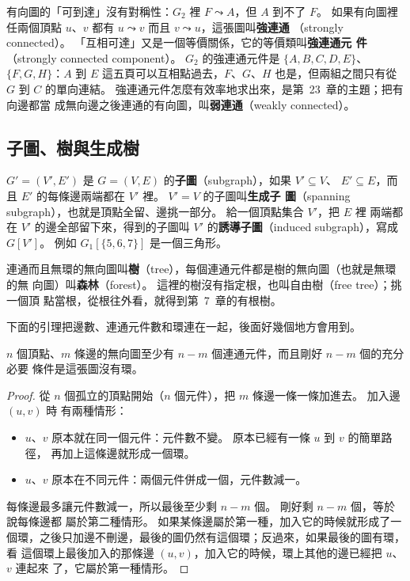 有向圖的「可到達」沒有對稱性：$G_2$ 裡 $F \leadsto A$，但 $A$ 到不了 $F$。 如果有向圖裡
任兩個頂點 $u$、$v$ 都有 $u \leadsto v$ 而且 $v \leadsto u$，這張圖叫\textbf{強連通}
（strongly connected）。 「互相可達」又是一個等價關係，它的等價類叫\textbf{強連通元
件}（strongly connected component）。 $G_2$ 的強連通元件是 $\{A, B, C, D, E\}$、
$\{F, G, H\}$：$A$ 到 $E$ 這五頁可以互相點過去，$F$、$G$、$H$ 也是，但兩組之間只有從
$G$ 到 $C$ 的單向連結。 強連通元件怎麼有效率地求出來，是第~23~章的主題；把有向邊都當
成無向邊之後連通的有向圖，叫\textbf{弱連通}（weakly connected）。

\subsection{子圖、樹與生成樹}

$G' = (V', E')$ 是 $G = (V, E)$ 的\textbf{子圖}（subgraph），如果 $V' \subseteq V$、
$E' \subseteq E$，而且 $E'$ 的每條邊兩端都在 $V'$ 裡。 $V' = V$ 的子圖叫\textbf{生成子
圖}（spanning subgraph），也就是頂點全留、邊挑一部分。 給一個頂點集合 $V'$，把 $E$ 裡
兩端都在 $V'$ 的邊全部留下來，得到的子圖叫 $V'$ 的\textbf{誘導子圖}（induced
subgraph），寫成 $G[V']$。 例如 $G_1[\{5, 6, 7\}]$ 是一個三角形。

連通而且無環的無向圖叫\textbf{樹}（tree），每個連通元件都是樹的無向圖（也就是無環的無
向圖）叫\textbf{森林}（forest）。 這裡的樹沒有指定根，也叫自由樹（free tree）；挑一個頂
點當根，從根往外看，就得到第~7~章的有根樹。

下面的引理把邊數、連通元件數和環連在一起，後面好幾個地方會用到。

\begin{lemma}
\label{lem:gtr-count}
$n$ 個頂點、$m$ 條邊的無向圖至少有 $n - m$ 個連通元件，而且剛好 $n - m$ 個的充分必要
條件是這張圖沒有環。
\end{lemma}

\begin{proof}
從 $n$ 個孤立的頂點開始（$n$ 個元件），把 $m$ 條邊一條一條加進去。 加入邊 $(u, v)$ 時
有兩種情形：
\begin{itemize}
\item $u$、$v$ 原本就在同一個元件：元件數不變。 原本已經有一條 $u$ 到 $v$ 的簡單路徑，
再加上這條邊就形成一個環。
\item $u$、$v$ 原本在不同元件：兩個元件併成一個，元件數減一。
\end{itemize}
每條邊最多讓元件數減一，所以最後至少剩 $n - m$ 個。 剛好剩 $n - m$ 個，等於說每條邊都
屬於第二種情形。 如果某條邊屬於第一種，加入它的時候就形成了一個環，之後只加邊不刪邊，最後的圖仍然有這個環；反過來，如果最後的圖有環，看
這個環上最後加入的那條邊 $(u, v)$，加入它的時候，環上其他的邊已經把 $u$、$v$ 連起來
了，它屬於第一種情形。
\end{proof}

